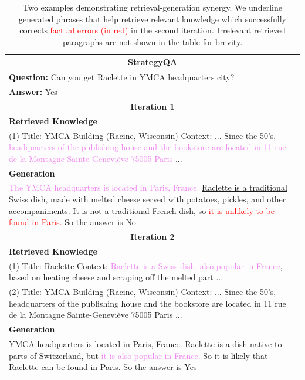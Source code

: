 \documentclass[11pt]{article}
\begin{document}
\begin{table}[t!]
{\begin{tabular}{p{\textwidth}}
        \midrule
        \multicolumn{1}{c}{\textbf{StrategyQA}} \\
        \midrule
        \textbf{Question:} Can you get Raclette in YMCA headquarters city?\\
        \textbf{Answer:} Yes\\
        \multicolumn{1}{c}{\textbf{Iteration 1}} \\
        \textbf{Retrieved Knowledge} \\
        (1) Title: YMCA Building (Racine, Wisconsin) Context: ... Since the 50's, \textcolor{violet}{headquarters of the publishing house and the bookstore are located in 11 rue de la Montagne Sainte-Geneviève 75005 Paris} ... \\
        \textbf{Generation}\\
        \textcolor{violet}{The YMCA headquarters is located in Paris, France.} \underline{Raclette is a traditional Swiss dish, made with melted cheese} served with potatoes, pickles, and other accompaniments. It is not a traditional French dish, so \textcolor{red}{it is unlikely to be found in Paris.} So the answer is No\\
        \multicolumn{1}{c}{\textbf{Iteration 2}} \\
        \textbf{Retrieved Knowledge} \\
        (1) Title: Raclette Context: \textcolor{violet}{Raclette is a Swiss dish, also popular in France}, based on heating cheese and scraping off the melted part ... \\
        (2) Title: YMCA Building (Racine, Wisconsin) Context: ... Since the 50's, headquarters of the publishing house and the bookstore are located in 11 rue de la Montagne Sainte-Geneviève 75005 Paris ... \\
        \textbf{Generation}\\
        YMCA headquarters is located in Paris, France. Raclette is a dish native to parts of Switzerland, but \textcolor{violet}{it is also popular in France.} So it is likely that Raclette can be found in Paris. So the answer is Yes \\
        \bottomrule
    \end{tabular}
    }
    \caption{
    Two examples demonstrating retrieval-generation synergy.
    We underline \underline{generated phrases that help} \underline{retrieve relevant knowledge} which successfully corrects \textcolor{red}{factual errors (in red)} in the second iteration.
    Irrelevant retrieved paragraphs are not shown in the table for brevity.
    }
    \label{tab:case}
\end{table}
\endgroup
\end{document}
